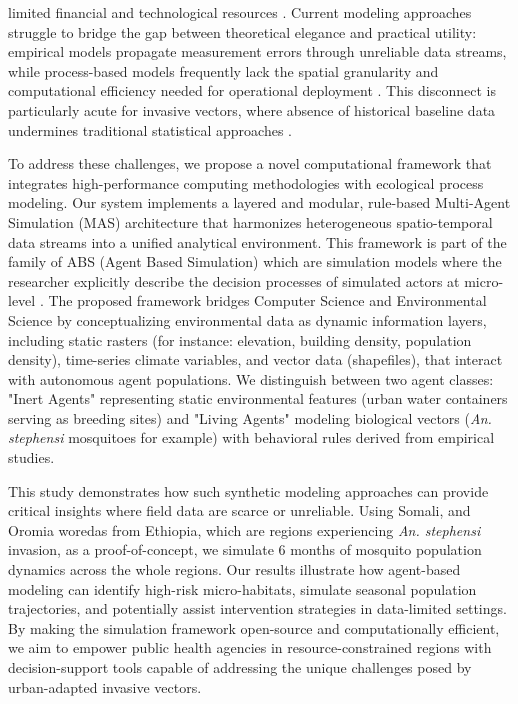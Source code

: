 \documentclass{article}
\begin{document}
limited financial and technological resources \citep{2025.RL.HMD}. Current modeling approaches struggle to bridge the gap between 
theoretical elegance and practical utility: empirical models propagate measurement errors through unreliable data streams, while 
process-based models frequently lack the spatial granularity and computational efficiency needed for operational 
deployment \citep{2025.RL.HMD}. This disconnect is particularly acute for invasive vectors, where absence of historical 
baseline data undermines traditional statistical approaches \citep{2019.EL.ALO}.
\par
To address these challenges, we propose a novel computational framework that integrates high-performance computing methodologies 
with ecological process modeling. Our system implements a layered and modular, rule-based Multi-Agent Simulation (MAS) architecture that 
harmonizes heterogeneous spatio-temporal data streams into a unified analytical environment. This framework is part of the 
family of ABS (Agent Based Simulation) which are simulation models where the researcher explicitly describe the decision 
processes of simulated actors at micro-level \citep{2008.PE.ITM}. The proposed framework bridges Computer Science and 
Environmental Science by conceptualizing environmental data as dynamic information layers, including static rasters (for instance: 
elevation, building density, population density), time-series climate variables, and vector data (shapefiles), that interact with 
autonomous agent populations. We distinguish between two agent classes: "Inert Agents" representing static environmental features 
(urban water containers serving as breeding sites) and "Living Agents" modeling biological vectors (\textit{An. stephensi} mosquitoes for 
example) with behavioral rules derived from empirical studies.
\par
This study demonstrates how such synthetic modeling approaches can provide critical insights where field data are scarce or 
unreliable. Using Somali, and Oromia woredas from Ethiopia, which are regions experiencing \textit{An. stephensi} invasion, 
\citep{2024.GZ.ROC,2023.DH.FRO} as a proof-of-concept, we simulate 6 months of mosquito population dynamics across the whole regions. 
Our results illustrate how agent-based modeling can identify high-risk micro-habitats, simulate seasonal population trajectories, and 
potentially assist intervention strategies in data-limited settings. By making the simulation framework open-source and computationally 
efficient, we aim to empower public health agencies in resource-constrained regions with decision-support tools capable of addressing the 
unique challenges posed by urban-adapted invasive vectors.
\end{document}
